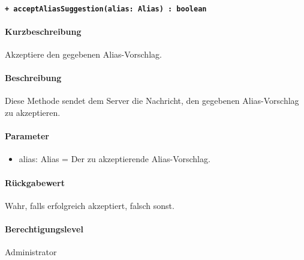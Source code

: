 \paragraph{\texttt{+ acceptAliasSuggestion(alias: Alias) : boolean}}\label{AP_Backend_acceptAliasSuggestion}%
\paragraph*{Kurzbeschreibung}
Akzeptiere den gegebenen Alias-Vorschlag.
\paragraph*{Beschreibung}
Diese Methode sendet dem Server die Nachricht, den gegebenen Alias-Vorschlag zu akzeptieren.
\paragraph*{Parameter}
\begin{itemize}
    \item alias: Alias = Der zu akzeptierende Alias-Vorschlag.
\end{itemize}
\paragraph*{Rückgabewert}
Wahr, falls erfolgreich akzeptiert, falsch sonst.
\paragraph*{Berechtigungslevel}
Administrator